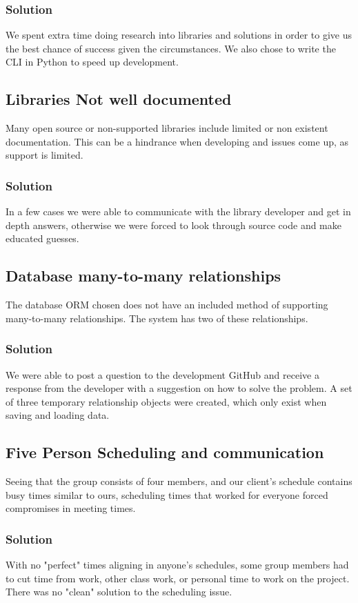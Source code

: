 \documentclass[onecolumn, draftclsnofoot,10pt, compsoc]{IEEEtran}
\begin{document}
		\subsubsection{Solution}
			We spent extra time doing research into libraries and solutions in order to give us the best chance of success given the circumstances. We also chose to write the CLI in Python to speed up development.
	\subsection{Libraries Not well documented}
      Many open source or non-supported libraries include limited or non existent documentation.
			This can be a hindrance when developing and issues come up, as support is limited.
  	\subsubsection{Solution}
	    In a few cases we were able to communicate with the library developer and get in depth answers,
			otherwise we were forced to look through source code and make educated guesses.
	\subsection{Database many-to-many relationships}
      The database ORM chosen does not have an included method of supporting many-to-many relationships.
			The system has two of these relationships.
  	\subsubsection{Solution}
	    We were able to post a question to the development GitHub and receive a response from the developer with a suggestion on how to solve the problem. A set of three temporary relationship objects were created, which only exist when saving and loading data.
	 	\subsection{Five Person Scheduling and communication}
		 Seeing that the group consists of four members, and our client's schedule contains busy times similar to ours, scheduling times that worked for everyone
		 forced compromises in meeting times.
  	\subsubsection{Solution}
		  With no "perfect" times aligning in anyone's schedules, some group members had to cut time from work, other class work, or personal time to work on the project.
		  There was no "clean" solution to the scheduling issue.
\end{document}
